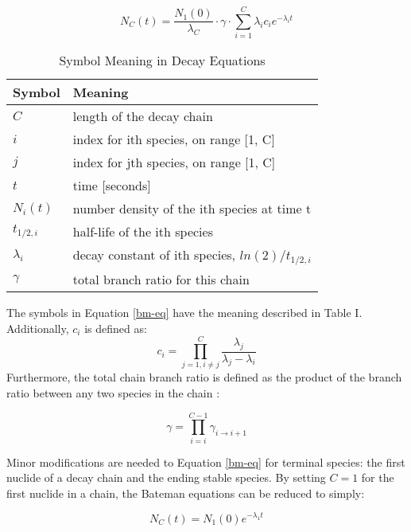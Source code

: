 \documentclass{anstrans}
\begin{document}
\begin{equation}
\label{bm-eq}
N_C(t) = \frac{N_1(0)}{\lambda_C} \cdot \gamma \cdot \sum_{i=1}^C \lambda_i c_{i} e^{-\lambda_i t}
\end{equation}

\begin{table}[hbt]
\label{decay-symbol-meaning}
\caption{Symbol Meaning in Decay Equations}
\begin{tabular}{|l|l|}
\hline
\textbf{Symbol} & \textbf{Meaning} \\
\hline
$C$         & length of the decay chain\\
$i$         & index for ith species, on range [1, C]\\
$j$         & index for jth species, on range [1, C]\\
$t$         & time [seconds]\\
$N_i(t)$    & number density of the ith species at time t\\
$t_{1/2,i}$ & half-life of the ith species\\
$\lambda_i$ & decay constant of ith species, $ln(2)/t_{1/2,i}$\\
$\gamma$    & total branch ratio for this chain\\
\hline
\end{tabular}
\end{table}

The symbols in Equation \ref{bm-eq} have the meaning described in Table I.
Additionally, $c_{i}$ is defined as:
\begin{equation}
\label{c_i}
c_i = \prod_{j=1,i\ne j}^C \frac{\lambda_j}{\lambda_j - \lambda_i}
\end{equation}
Furthermore, the total chain branch ratio is defined as the product of the 
branch ratio between any two species in the chain \cite{harr2007precise}:

\begin{equation}
\label{gamma}
\gamma = \prod_{i=i}^{C-1} \gamma_{i \to i+1}
\end{equation}

Minor modifications are needed to Equation \ref{bm-eq} for terminal species: 
the first nuclide of a decay chain and the ending stable species. By setting 
$C=1$ for the first nuclide in a chain, the Bateman equations can be reduced 
to simply:

\begin{equation}
\label{N_C}
N_C(t) = N_1(0) e^{-\lambda_1 t}
\end{equation}
\end{document}
